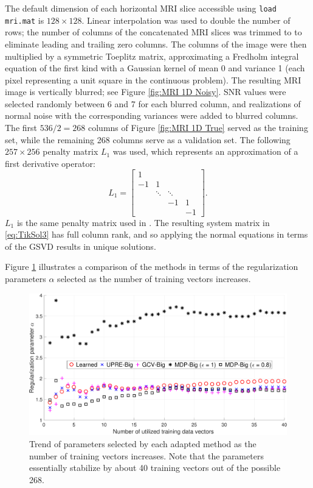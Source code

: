 \documentclass[12pt]{article}
\newcommand{\regparam}{\alpha}
\begin{document}
\noindent The default dimension of each horizontal MRI slice accessible using \texttt{load mri.mat} is $128 \times 128$. Linear interpolation was used to double the number of rows; the number of columns of the concatenated MRI slices was trimmed to to eliminate leading and trailing zero columns. The columns of the image were then multiplied by a symmetric Toeplitz matrix, approximating a Fredholm integral equation of the first kind with a Gaussian kernel of mean 0 and variance 1 (each pixel representing a unit square in the continuous problem). The resulting MRI image is vertically blurred; see Figure \ref{fig:MRI 1D Noisy}. SNR values were selected randomly between 6 and 7 for each blurred column, and realizations of normal noise with the corresponding variances were added to blurred columns. The first $536/2 = 268$ columns of Figure \ref{fig:MRI 1D True} served as the training set, while the remaining 268 columns serve as a validation set.  The following $257 \times 256$ penalty matrix $L_1$ was used, which represents an approximation of a first derivative operator:
\[L_1 = \begin{bmatrix}
1 & & & \\
-1 & 1 & &  \\
 & \ddots &  \ddots & \\
 & & -1 & 1 \\
 & & & -1
\end{bmatrix}.\]
$L_1$ is the same penalty matrix used in \cite{ChungEspanol2017}. The resulting system matrix in \eqref{eq:TikSol3} has full column rank, and so applying the normal equations in terms of the GSVD results in unique solutions. \par 
Figure \ref{fig:Parameters 1D MRI} illustrates a comparison of the methods in terms of the regularization parameters $\regparam$ selected as the number of training vectors increases. 

\begin{figure}[ht]
\includegraphics[scale=0.36]{Figures/Parameters1D_mri}
\caption{Trend of parameters selected by each adapted method as the number of training vectors increases. Note that the parameters essentially stabilize by about 40 training vectors out of the possible 268.}
\label{fig:Parameters 1D MRI}
\end{figure}
\end{document}

